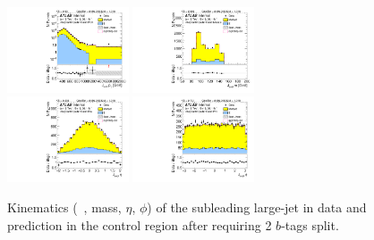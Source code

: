 \begin{figure}[htbp!]
\begin{center}
\includegraphics[width=0.32\textwidth,angle=-90]{figures/boosted/Control/b77_TwoTag_split_Control_sublHCand_Pt_m_1.pdf}
\includegraphics[width=0.32\textwidth,angle=-90]{figures/boosted/Control/b77_TwoTag_split_Control_sublHCand_Mass_s.pdf}\\
\includegraphics[width=0.32\textwidth,angle=-90]{figures/boosted/Control/b77_TwoTag_split_Control_sublHCand_Eta.pdf}
\includegraphics[width=0.32\textwidth,angle=-90]{figures/boosted/Control/b77_TwoTag_split_Control_sublHCand_Phi.pdf}
  \caption{Kinematics (\pt~, mass, $\eta$, $\phi$) of the subleading large-\R jet in data and prediction in the control region after requiring 2 $b$-tags split. }
  \label{fig:boosted-2bs-control-ak10-subl}
\end{center}
\end{figure}

